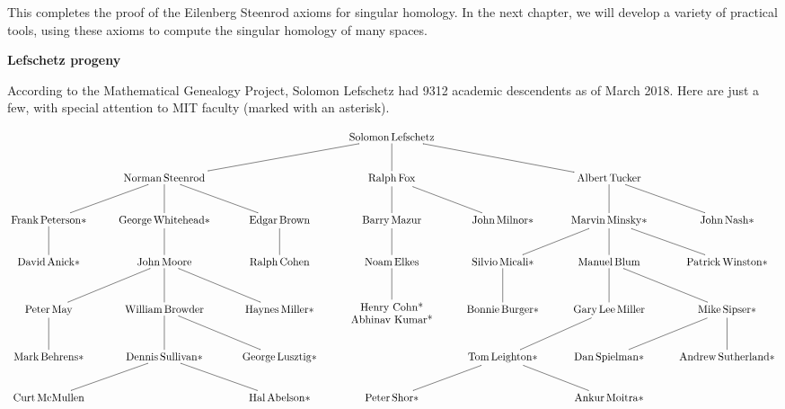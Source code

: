 This completes the proof of the Eilenberg Steenrod axioms for singular homology. In the next chapter, we will develop a variety of practical tools, using these axioms to compute the singular homology of many spaces. 

\begin{landscape}
\begin{center}
\textbf{Lefschetz progeny}
\end{center}
\medskip
\noindent
According to the Mathematical Genealogy Project, Solomon Lefschetz had
9312 academic descendents as of March 2018. Here are just a few, with special 
attention to MIT faculty (marked with an asterisk).

\scriptsize
\[
\xymatrix{
&&& \mathrm{Solomon\,Lefschetz} \ar@{-}[dll] \ar@{-}[d] \ar@{-}[drr] \\
& \mathrm{Norman\,Steenrod} \ar@{-}[dl] \ar@{-}[d] \ar@{-}[dr] &&
\mathrm{Ralph\,Fox} \ar@{-}[d] \ar@{-}[dr] &&
\mathrm{Albert\,Tucker} \ar@{-}[d] \ar@{-}[dr] \\
\mathrm{Frank\,Peterson*} \ar@{-}[d] & 
\mathrm{George\,Whitehead*} \ar@{-}[d] &
\mathrm{Edgar\,Brown} \ar@{-}[d] & 
\mathrm{Barry\,Mazur} \ar@{-}[d] & 
\mathrm{John\,Milnor*} & 
\mathrm{Marvin\,Minsky*} \ar@{-}[dl] \ar@{-}[d] \ar@{-}[dr] &
\mathrm{John\,Nash*} \\
\mathrm{David\,Anick*} & 
\mathrm{John\,Moore} \ar@{-}[dl] \ar@{-}[d] \ar@{-}[dr] &
\mathrm{Ralph\,Cohen} &
\mathrm{Noam\,Elkes}  \ar@{-}[d] &
\mathrm{Silvio\,Micali*} \ar@{-}[d] &
\mathrm{Manuel\,Blum} \ar@{-}[d] \ar@{-}[dr] & 
\mathrm{Patrick\,Winston*} \\
\mathrm{Peter\,May} \ar@{-}[d] & 
\mathrm{William\,Browder} \ar@{-}[d] \ar@{-}[dr] & 
\mathrm{Haynes\,Miller*} &
{\txt{Henry Cohn*\\Abhinav Kumar*}} &
\mathrm{Bonnie\,Burger*} &
\mathrm{Gary\,Lee\,Miller} \ar@{-}[dl] & 
\mathrm{Mike\,Sipser*} \ar@{-}[dl] \ar@{-}[d] \\
\mathrm{Mark\,Behrens*} &  
\mathrm{Dennis\,Sullivan*} \ar@{-}[dl] \ar@{-}[dr] & 
\mathrm{George\,Lusztig*} &&
\mathrm{Tom\,Leighton*} \ar@{-}[dl] \ar@{-}[dr] &
\mathrm{Dan\,Spielman*} &
\mathrm{Andrew\,Sutherland*} \\
\mathrm{Curt\,McMullen} &&
\mathrm{Hal\,Abelson*} &
\mathrm{Peter\,Shor*} &&
\mathrm{Ankur\,Moitra*} 
}
\]
\normalsize
\end{landscape}


